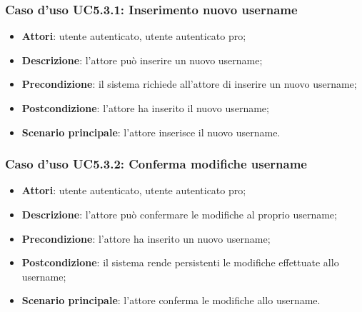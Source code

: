\subsubsection{Caso d'uso UC5.3.1: Inserimento nuovo username}

\begin{itemize}
	\item \textbf{Attori}: utente autenticato, utente autenticato pro;
	\item \textbf{Descrizione}: l'attore può inserire un nuovo username;
	\item \textbf{Precondizione}: il sistema richiede all'attore di inserire un nuovo username;
	\item \textbf{Postcondizione}: l'attore ha inserito il nuovo username;
	\item \textbf{Scenario principale}: l'attore inserisce il nuovo username.
\end{itemize}

\subsubsection{Caso d'uso UC5.3.2: Conferma modifiche username}

\begin{itemize}
	\item \textbf{Attori}: utente autenticato, utente autenticato pro;
	\item \textbf{Descrizione}: l'attore può confermare le modifiche al proprio username;
	\item \textbf{Precondizione}: l'attore ha inserito un nuovo username;
	\item \textbf{Postcondizione}: il sistema rende persistenti le modifiche effettuate allo username;
	\item \textbf{Scenario principale}: l'attore conferma le modifiche allo username.
\end{itemize}

